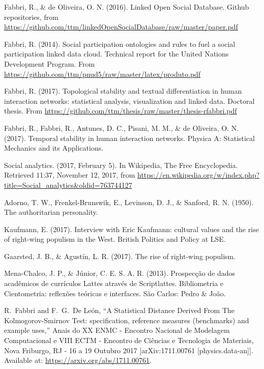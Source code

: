 \documentclass[letterpaper,10pt]{article}
\begin{document}
\begin{thebibliography}{99}

	Fabbri, R., \& de Oliveira, O. N. (2016). Linked Open Social Database. Github repositories, from \url{https://github.com/ttm/linkedOpenSocialDatabase/raw/master/paper.pdf}

Fabbri, R. (2014). Social participation ontologies and rules to fuel a social participation linked data cloud.
	Technical report for the United Nations Development Program.
		From \url{https://github.com/ttm/pnud5/raw/master/latex/produto.pdf}

Fabbri, R. (2017). Topological stability and textual differentiation in human interaction networks:
		statistical analysis, visualization and linked data. Doctoral thesis.
		From \url{https://github.com/ttm/thesis/raw/master/thesis-rfabbri.pdf}

Fabbri, R., Fabbri, R., Antunes, D. C., Pisani, M. M., \& de Oliveira, O. N. (2017). Temporal stability in human interaction networks. Physica A: Statistical Mechanics and its Applications.

	Social analytics. (2017, February 5). In Wikipedia, The Free Encyclopedia. Retrieved 11:37, November 12, 2017, from \url{https://en.wikipedia.org/w/index.php?title=Social\_analytics\&oldid=763744127}

	Adorno, T. W., Frenkel-Brunswik, E., Levinson, D. J., \& Sanford, R. N. (1950). The authoritarian personality.

Kaufmann, E. (2017). Interview with Eric Kaufmann: cultural values and the rise of right-wing populism in the West. British Politics and Policy at LSE.

	Gaarsted, J. B., \& Agustín, L. R. (2017). The rise of right-wing populism.

	Mena-Chalco, J. P., \& Júnior, C. E. S. A. R. (2013). Prospecção de dados acadêmicos de currículos Lattes através de Scriptlattes. Bibliometria e Cientometria: reflexões teóricas e interfaces. São Carlos: Pedro \& João.

  R.~Fabbri and F.~G.~De León,
  ``A Statistical Distance Derived From The Kolmogorov-Smirnov Test: specification, reference measures (benchmarks) and example uses,''
  Anais do XX ENMC - Encontro Nacional de Modelagem Computacional e
  VIII ECTM - Encontro de Ci\^encias e Tecnologia de Materiais, Nova Friburgo,
  RJ - 16 a 19 Outubro 2017
		[arXiv:1711.00761 [physics.data-an]]. Available at: \url{https://arxiv.org/abs/1711.00761}.


\end{thebibliography}
\end{document}
